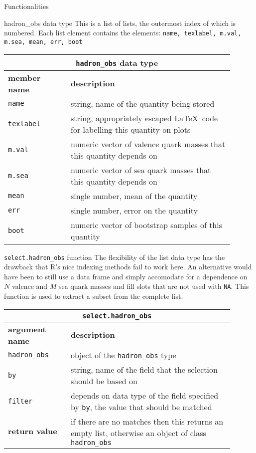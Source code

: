 \documentclass[10pt,a4paper]{article}
\begin{document}
\begin{section}{Functionalities}

\begin{subsection}{{\ttfamily hadron\_obs} data type}
This is a list of lists, the outermost index of which is numbered. Each list element contains the elements: {\tt name, texlabel, m.val, m.sea, mean, err, boot}

{ \centering
\begin{tabular}{|p{0.25\linewidth}|p{0.65\linewidth}|}
\hline
\multicolumn{2}{|c|}{ {\tt hadron\_obs} data type } \\
\hline \hline \textbf{member name} & \textbf{description} \\ \hline
{\tt name} & string, name of the quantity being stored \\ 
{\tt texlabel}  & string, appropriately escaped \LaTeX\, code for labelling this quantity on plots \\
{\tt m.val} & numeric vector of valence quark masses that this quantity depends on \\
{\tt m.sea} & numeric vector of sea quark masses that this quantity depends on \\
{\tt mean} & single number, mean of the quantity \\
{\tt err} & single number, error on the quantity \\
{\tt boot} & numeric vector of bootstrap samples of this quantity \\
\hline 
\end{tabular}
} %

\begin{subsubsection}{{\tt select.hadron\_obs} function}
The flexibility of the list data type has the drawback that R's nice indexing methods fail to work here.
An alternative would have been to still use a data frame and simply accomodate for a dependence on $N$ valence and $M$ sea quark masses and fill slots that are not used with {\tt NA}.
This function is used to extract a subset from the complete list.

{ \centering
\begin{tabular}{|p{0.25\linewidth}|p{0.65\linewidth}|}
\hline
\multicolumn{2}{|c|}{ {\tt select.hadron\_obs} } \\
\hline \hline \textbf{argument name} & \textbf{description} \\
\hline {\tt hadron\_obs} & object of the {\tt hadron\_obs} type \\ 
{\tt by} & string, name of the field that the selection should be based on \\ 
{\tt filter} & depends on data type of the field specified by {\tt by}, the value that should be matched \\ 
\hline \hline
\textbf{return value} & if there are no matches then this returns an empty list, otherwise an object of class {\tt hadron\_obs} \\
\hline
\end{tabular}
} %


\end{subsubsection}
\end{subsection}
\end{section}
\end{document}
